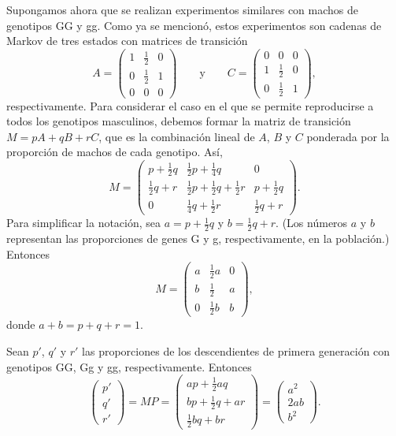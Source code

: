 \documentclass[12pt,a4paper]{book}
\begin{document}
    Supongamos ahora que se realizan experimentos similares con machos de genotipos GG y gg. Como ya se mencionó, estos experimentos son cadenas de Markov de tres estados con matrices de transición
    \begin{equation*}
        A=\begin{pmatrix}1&\frac12&0\\0&\frac12&1\\0&0&0\end{pmatrix} \qquad\text{y}\qquad C=\begin{pmatrix}0&0&0\\1&\frac12&0\\0&\frac12&1\end{pmatrix},
    \end{equation*}
    respectivamente. Para considerar el caso en el que se permite reproducirse a todos los genotipos masculinos, debemos formar la matriz de transición $M=pA+qB+rC$, que es la combinación lineal de $A$, $B$ y $C$ ponderada por la proporción de machos de cada genotipo. Así,
    \begin{equation*}
        M=\begin{pmatrix}
            p+\frac12q & \frac12p+\frac14q & 0\\[0.5ex]
            \frac12q+r & \frac12p+\frac12q+\frac12r & p+\frac12q\\[0.5ex]
            0 & \frac14q+\frac12r & \frac12q+r
        \end{pmatrix}.
    \end{equation*}
    Para simplificar la notación, sea $a=p+\frac12q$ y $b=\frac12q+r$. (Los números $a$ y $b$ representan las proporciones de genes G y g, respectivamente, en la población.) Entonces
    \begin{equation*}
        M=\begin{pmatrix}a&\frac12a&0\\b&\frac12&a\\0&\frac12b&b\end{pmatrix},
    \end{equation*}
    donde $a+b=p+q+r=1$.

    Sean $p'$, $q'$ y $r'$ las proporciones de los descendientes de primera generación con genotipos GG, Gg y gg, respectivamente. Entonces
    \begin{equation*}
        \begin{pmatrix}p'\\q'\\r'\end{pmatrix}=MP=\begin{pmatrix}ap+\frac12aq\\bp+\frac12q+ar\\\frac12bq+br\end{pmatrix}=\begin{pmatrix}a^2\\2ab\\b^2\end{pmatrix}.
    \end{equation*}
\end{document}
